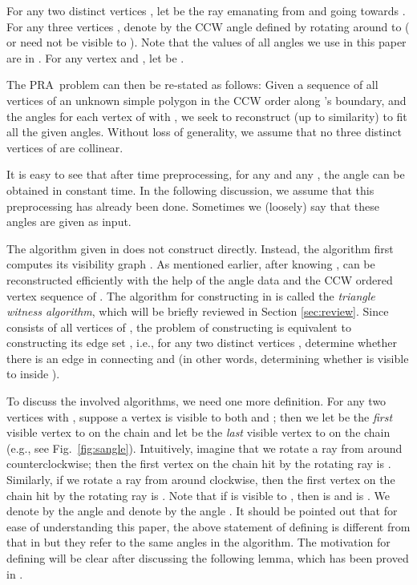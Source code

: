 \documentclass[11pt]{article}
\def\pra{PRA}
\begin{document}
For any two distinct vertices , let  be the ray emanating from
 and going towards . For any three vertices , denote by
 the CCW angle defined by rotating
 around  to  ( or  need not be
visible to ). Note that the values
of all angles we use in this paper are in . For any
vertex  and , let  be
. 

The \pra\ problem can then be
re-stated as follows: Given a sequence of all vertices
 of an unknown simple polygon  in the CCW order along
's boundary, and the angles  for each vertex  of  with
, we seek to reconstruct  (up to
similarity) to fit all the given angles. 
Without loss of generality, we assume that no three distinct vertices of  are collinear.

It is easy to see that after  time preprocessing, for any  and any
, the angle  can be obtained
in constant time. In the following discussion, we assume that this
preprocessing has already been done. Sometimes we (loosely) say that these
angles are given as input.

The algorithm given in \cite{ref:DisserRe10} does not construct  directly.
Instead, the algorithm first computes its visibility graph . 
As mentioned earlier, after knowing ,  can be reconstructed efficiently with
the help of the angle data and the CCW ordered vertex sequence of . 
The algorithm for constructing  in \cite{ref:DisserRe10} is
called the {\em triangle witness algorithm}, which will be briefly reviewed
in Section \ref{sec:review}.
Since  consists of all vertices of , the
problem of constructing  is equivalent to constructing its edge set
, i.e., for any two distinct vertices , 
determine whether there is an edge  in  connecting 
and  (in other words,
determining whether  is visible to  inside ).


To discuss the involved algorithms, we need one more definition.
For any two vertices  with
, 
suppose a vertex  
is visible to both  and ; then we let  be the
{\em first} visible vertex to  on the chain  and let
 be the {\em last} visible vertex to  on the chain 
(e.g., see Fig.~\ref{fig:sangle}). Intuitively, imagine that we
rotate a ray from  around 
counterclockwise; then the first vertex on the chain
 hit by the rotating ray  is .
Similarly, if we rotate a ray from
 around  clockwise,
then the first vertex on the chain  hit by
the rotating ray is . 
Note that if  is visible to , then
 is  and  is .  We denote by 
 the angle  and denote
by  the angle . It should be 
pointed out that for ease of understanding this paper, the above statement of defining  
is different from that in \cite{ref:DisserRe10} but they refer to the
same angles in the algorithm. The motivation for
defining  will be clear after discussing the
following lemma, which has been proved in \cite{ref:DisserRe10}. 
\end{document}
